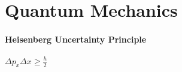 \section{Quantum Mechanics}

\paragraph{Heisenberg Uncertainty Principle}
$\Delta p_x \Delta x \geq \frac{h}{2}$





